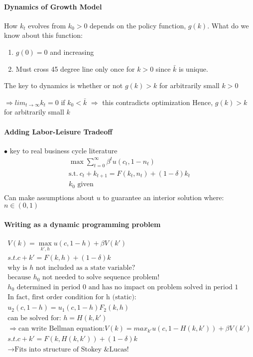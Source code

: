 \documentclass{article}
\begin{document}
\paragraph[definition]{Dynamics of Growth Model}
{How $k_t$ evolves from $k_0>0$ depends on the policy function, $g(k)$. What do we know about this function:
\begin{enumerate}
    \item $g(0) = 0$ and increasing
    \item Must cross 45 degree line only once for $k>0$ since $\bar{k}$ is unique.
\end{enumerate}
The key to dynamics is whether or not $g(k)>k$ for arbitrarily small $k>0$
}



$\Rightarrow lim_{t \to \infty} k_t = 0$ if $k_0 < \bar{k}$
$\Rightarrow$ this contradicts optimization
Hence, $g(k) > k$ for arbitrarily small $k$


\paragraph[definition]{Adding Labor-Leisure Tradeoff}
{
$\bullet$ key to real business cycle literature
\[
    \begin{aligned}
    \max_{} \sum_{t=0}^\infty \beta^t u(c_t, 1-n_t)\\
    \text{s.t.}\ c_t + k_{t+1} = F(k_t,n_t) + (1-\delta)k_t\\
    k_0 \text{ given}\\
    \end{aligned}
\]
Can make assumptions about $u$ to guarantee an interior solution where:\\
$n \in (0,1)$
}

\paragraph{Writing as a dynamic programming problem}
{
\[
    \begin{aligned}
    V(k) = \max_{k',h}{u(c,1-h)+ \beta V(k')} \\
    s.t. c+k' = F(k,h) + (1-\delta)k \\
    \text{why is $h$ not included as a state variable?} \\
    \text{because $h_0$ not needed to solve sequence problem!} \\
    \text{$h_0$ determined in period 0 and has no impact on problem solved in period 1} \\
    \text{In fact, first order condition for h (static):} \\
    u_2(c,1-h) = u_1(c, 1-h)F_2(k,h) \\
    \text{can be solved for: } h = H(k,k') \\
    \Rightarrow \text{can write Bellman equation:}
    V(k) = max_{k'}{u(c,1-H(k,k')) + \beta V(k')} \\
    s.t. c+k' = F(k,H(k,k')) + (1-\delta)k \\
    \rightarrow \text{Fits into structure of Stokey \& Lucas!}
    \end{aligned}
\]
}
\end{document}
